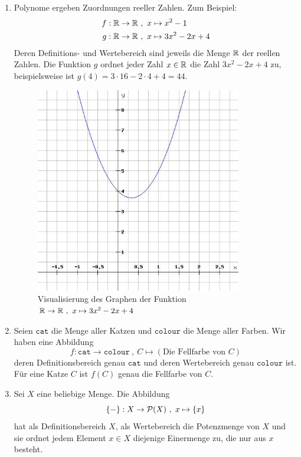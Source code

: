 \begin{bsp} \label{bsp:abbildung} \quad
    \begin{enumerate}
        \item Polynome ergeben Zuordnungen reeller Zahlen. Zum Beispiel:
        \begin{align*}
            f: \mathbb R \to \mathbb R \ & ,\ x  \mapsto x^2-1 \\
            g: \mathbb R \to \mathbb R \ & ,\  x  \mapsto 3x^2-2x+4
        \end{align*}
        Deren Definitions- und Wertebereich sind jeweils die Menge $\mathbb R$ der reellen Zahlen. Die Funktion $g$ ordnet jeder Zahl $x\in\mathbb R$ die Zahl $3x^2-2x+4$ zu, beispielsweise ist $g(4) = 3\cdot 16 - 2\cdot 4 + 4 = 44$.
        \begin{figure}[ht]
            \includegraphics[width=9cm]{./_img/Polynom-Plot.jpeg}
            \centering \caption{Visualisierung des Graphen der Funktion $\mathbb R\to \mathbb R \ ,\ x\mapsto 3x^2-2x+4$}
        \end{figure}
        \item Seien $\mathtt{cat}$ die Menge aller Katzen und $\mathtt{colour}$ die Menge aller Farben. Wir haben eine Abbildung
            \[ f: \mathtt{cat} \to \mathtt{colour} \ ,\ C \mapsto (\text{Die Fellfarbe von $C$}) \]
        deren Definitionsbereich genau $\mathtt{cat}$ und deren Wertebereich genau $\mathtt{colour}$ ist. Für eine Katze $C$ ist $f(C)$ genau die Fellfarbe von $C$.
        \item Sei $X$ eine beliebige Menge. Die Abbildung
            \[ \{-\}: X \to \mathcal P(X) \ ,\ x \mapsto \{x\} \]
        hat als Definitionsbereich $X$, als Wertebereich die Potenzmenge von $X$ und sie ordnet jedem Element $x \in X$ diejenige Einermenge zu, die nur aus $x$ besteht. 


\end{enumerate}
\end{bsp}
